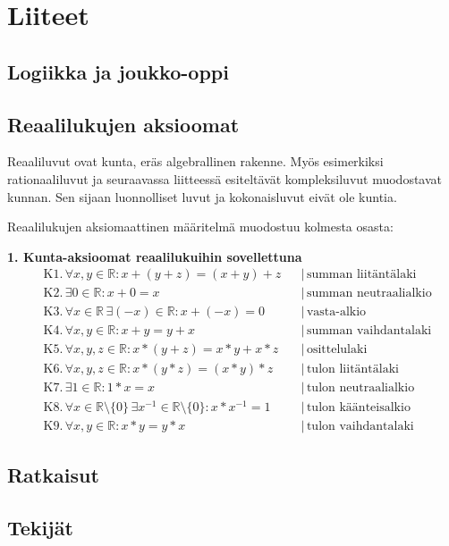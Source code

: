 \part{Liiteet}
\chapter{Logiikka ja joukko-oppi}
\chapter{Reaalilukujen aksioomat}
Reaaliluvut ovat kunta, eräs algebrallinen rakenne. Myös esimerkiksi rationaaliluvut ja seuraavassa liitteessä esiteltävät kompleksiluvut muodostavat kunnan. Sen sijaan luonnolliset luvut ja kokonaisluvut eivät ole kuntia.

Reaalilukujen aksiomaattinen määritelmä muodostuu kolmesta osasta:

\textbf{1. Kunta-aksioomat reaalilukuihin sovellettuna} \\
\begin{align*}
&\text{K1.} \, \forall x, y \in \mathbb{R}: x+(y+z) = (x+y)+z & &| \, \text{summan liitäntälaki} \\
&\text{K2.} \, \exists 0 \in \mathbb{R}: x+0 = x & &| \, \text{summan neutraalialkio} \\
&\text{K3.} \, \forall x \in \mathbb{R} \, \exists (-x) \in \mathbb{R}: x+(-x)=0 & &| \, \text{vasta-alkio} \\
&\text{K4.} \, \forall x, y \in \mathbb{R}: x+y = y+x & &| \, \text{summan vaihdantalaki} \\
&\text{K5.} \, \forall x, y, z \in \mathbb{R}: x*(y+z) = x*y + x*z & &| \, \text{osittelulaki} \\
&\text{K6.} \, \forall x, y, z \in \mathbb{R}: x*(y*z) = (x*y)*z & &| \, \text{tulon liitäntälaki} \\
&\text{K7.} \, \exists 1 \in \mathbb{R}: 1*x = x & &| \, \text{tulon neutraalialkio} \\
&\text{K8.} \, \forall x \in \mathbb{R} \setminus \{0\} \, \exists x^{-1} \in \mathbb{R} \setminus \{0\}: x*x^{-1}=1 & &| \, \text{tulon käänteisalkio} \\
&\text{K9.} \, \forall x, y \in \mathbb{R}: x*y = y*x & &| \, \text{tulon vaihdantalaki}
\end{align*}

\chapter{Ratkaisut}


\chapter{Tekijät}

